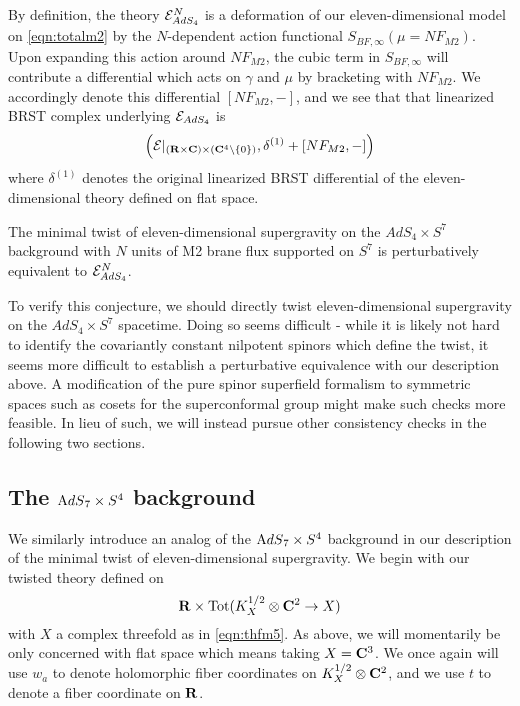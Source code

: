 \documentclass[../main.tex]{subfiles}
\begin{document}
\begin{rmk}
By definition, the theory $\mathcal E_{AdS_4}^N$ is a deformation of our eleven-dimensional model on \eqref{eqn:totalm2} by the $N$-dependent action functional $S_{BF, \infty}(\mu = N F_{M2})$.
Upon expanding this action around $NF_{M2}$, the cubic term in $S_{BF,\infty}$ will contribute a differential which acts on $\gamma$ and $\mu$ by bracketing with $NF_{M2}$. We accordingly denote this differential $[NF_{M2}, - ] $, and we see that that linearized BRST complex underlying $\mathcal{E}_{AdS_4}$ is \[\left ( \mathcal{E} |_{(\mathbf{R}\times \mathbf{C})\times (\mathbf{C}^4\setminus \{0\} ) }, \delta^{(1)} + [NF_{M2},-] \right )\] where $\delta^{(1)}$ denotes the original linearized BRST differential of the eleven-dimensional theory defined on flat space.
\end{rmk}

\begin{conj}\label{conj:ads4}
The minimal twist of eleven-dimensional supergravity on the $AdS_4\times S^7$ background with $N$ units of M2 brane flux supported on $S^7$ is perturbatively equivalent to $\mathcal{E}^N_{AdS_4}$.
\end{conj}

To verify this conjecture, we should directly twist eleven-dimensional supergravity on the $AdS_4\times S^7$ spacetime. Doing so seems difficult - while it is likely not hard to identify the covariantly constant nilpotent spinors which define the twist, it seems more difficult to establish a perturbative equivalence with our description above. A modification of the pure spinor superfield formalism to symmetric spaces such as cosets for the superconformal group might make such checks more feasible. In lieu of such, we will instead pursue other consistency checks in the following two sections{}. 

\subsection{The ${\mathrm{A}dS}_7 \times S^4$ background}

We similarly introduce an analog of the ${\mathrm{A}dS}_7 \times S^4$ background in our description of the minimal twist of eleven-dimensional supergravity.
We begin with our twisted theory defined on
\[
\mathbf{R} \times \operatorname{Tot}(K_{X}^{1/2}\otimes \mathbf{C}^2 \to X)
\]
with $X$ a complex threefold as in \eqref{eqn:thfm5}.
As above, we will momentarily be only concerned with flat space which means taking $X = \mathbf{C}^3$.
We once again will use $w_a$ to denote holomorphic fiber coordinates on $K^{1/2}_{X}\otimes \mathbf{C}^2$, and we use $t$ to denote a fiber coordinate on $\mathbf{R}$.
\end{document}
